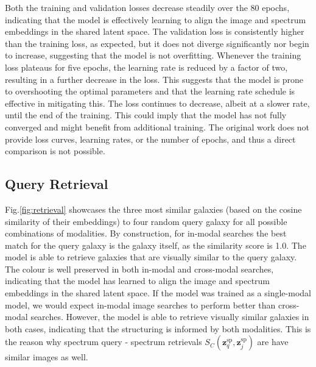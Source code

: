 \documentclass[draft, a4paper,12pt]{article}
\begin{document}
Both the training and validation losses decrease steadily over the 80 epochs, indicating that the model is effectively learning to align the image and spectrum embeddings in the shared latent space. The validation loss is consistently higher than the training loss, as expected, but it does not diverge significantly nor begin to increase, suggesting that the model is not overfitting. Whenever the training loss plateaus for five epochs, the learning rate is reduced by a factor of two, resulting in a further decrease in the loss. This suggests that the model is prone to overshooting the optimal parameters and that the learning rate schedule is effective in mitigating this. The loss continues to decrease, albeit at a slower rate, until the end of the training. This could imply that the model has not fully converged and might benefit from additional training. The original work does not provide loss curves, learning rates, or the number of epochs, and thus a direct comparison is not possible.









\subsection{Query Retrieval}
Fig.\ref{fig:retrieval} showcases the three most similar galaxies (based on the cosine similarity of their embeddings) to four random query galaxy for all possible combinations of modalities. By construction, for in-modal searches the best match for the query galaxy is the galaxy itself, as the similarity score is 1.0. The model is able to retrieve galaxies that are visually similar to the query galaxy. The colour is well preserved in both in-modal and cross-modal searches, indicating that the model has learned to align the image and spectrum embeddings in the shared latent space. If the model was trained as a single-modal model, we would expect in-modal image searches to perform better than cross-modal searches. However, the model is able to retrieve visually similar galaxies in both cases, indicating that the structuring is informed by both modalities.  This is the reason why spectrum query - spectrum retrievals $S_C(\mathbf{z}^{\text{sp}}_q, \mathbf{z}^{\text{sp}}_j)$ are have similar images as well. 
\end{document}
